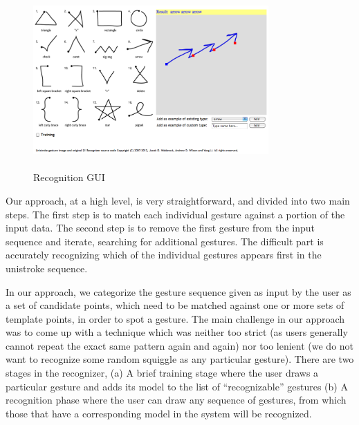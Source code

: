 \documentclass[twoside]{article}
\begin{document}
\begin{multicols}{2}
\begin{figure}[H]
	\centering
	\includegraphics[height=6cm, width=9cm]{Images/GUI.png}
	\label{fig1}
	\caption{Recognition GUI}
\end{figure}
  

Our approach, at a high level, is very straightforward, and divided into two
main steps. The first step is to match each individual gesture against a portion
of the input data. The second step is to remove the first gesture from the input
sequence and iterate, searching for additional gestures.
The difficult part is accurately recognizing which of the individual gestures
appears first in the unistroke sequence.

In our approach, we categorize the gesture sequence given as input by the user
as a set of candidate points, which need to be matched against one or more sets
of template points, in order to spot a gesture. The main challenge in our
approach was to come up with a technique which was neither too strict (as users
generally cannot repeat the exact same pattern again and again) nor too lenient
(we do not want to recognize some random squiggle as any particular gesture).
There are two stages in the recognizer, (a) A brief training stage where the
user draws a particular gesture and adds its model to the list of
``recognizable'' gestures (b) A recognition phase where the user can draw any
sequence of gestures, from which those that have a corresponding model in the
system will be recognized.


\end{multicols}
\end{document}
